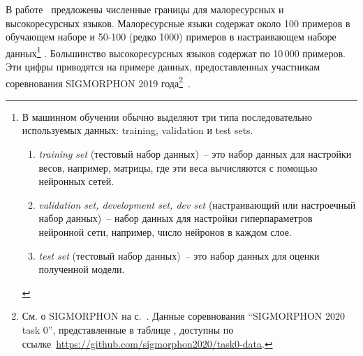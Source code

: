 
В работе~\cite{Anastasopoulos2019Pushing_Limits_Low-Resource_MI}
предложены численные границы для малоресурсных и высокоресурсных языков. 
Малоресурсные языки содержат около 100 примеров в обучающем наборе
и 50-100 (редко 1000) примеров в настраивающем наборе данных\footnote{%
    В машинном обучении обычно выделяют три типа
    последовательно используемых данных: training, validation и test sets.
    \begin{enumerate}[label=(\roman*)]
        \item \emph{training set} (тестовый набор данных)~--
            это набор данных для настройки весов, например, матрицы,
            где эти веса вычисляются с помощью нейронных сетей.

        \item \emph{validation set, development set, dev set}
            (настраивающий или настроечный набор данных)~--
            набор данных для настройки гиперпараметров нейронной сети,
            например, число нейронов в каждом слое.

        \item \emph{test set} (тестовый набор данных)~-- это набор данных
            для оценки полученной модели.
    \end{enumerate}
    }%
%
.
Большинство высокоресурсных языков содержат по 10\,000 примеров.
Эти цифры приводятся на примере данных,
предоставленных участникам соревнования SIGMORPHON 2019 года\footnote{%
    См. о SIGMORPHON на с.~\pageref{SIGMORPHON}.
    Данные соревнования ``SIGMORPHON 2020 task 0'', представленные
    в таблице ,
    доступны по
    ссылке~\url{https://github.com/sigmorphon2020/task0-data}.
}~\cite{Anastasopoulos2019Pushing_Limits_Low-Resource_MI}.

